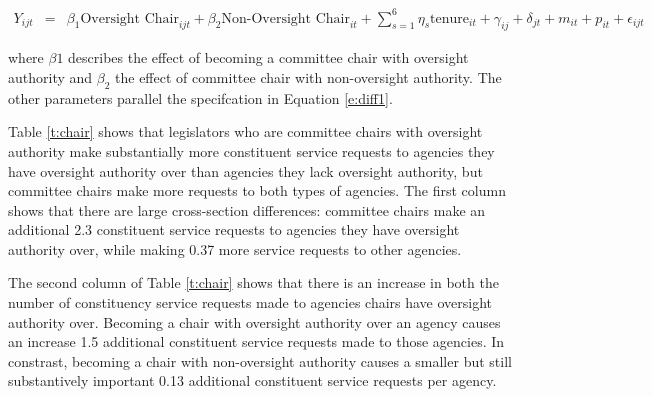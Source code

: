 \documentclass{article}
\begin{document}
\begin{eqnarray}
Y_{ijt} & = & \beta_{1} \text{Oversight Chair}_{ijt} + \beta_{2} \text{Non-Oversight Chair}_{it}  + \sum_{s = 1}^{6} \eta_{s} \text{tenure}_{it} + \gamma_{ij} +  \delta_{jt} +  m_{it} + p_{it} +  \epsilon_{ijt} \label{e:diff2}
\end{eqnarray}

where $\beta{1}$ describes the effect of becoming a committee chair with oversight authority and $\beta_{2}$ the effect of committee chair with non-oversight authority.  The other parameters parallel the specifcation in Equation \ref{e:diff1}.


Table \ref{t:chair} shows that legislators who are committee chairs with oversight authority make substantially more constituent service requests to agencies they have oversight authority over than agencies they lack oversight authority, but committee chairs make more requests to both types of agencies.  The first column shows that there are large cross-section differences: committee chairs make an additional 2.3 constituent service requests to agencies they have oversight authority over, while making 0.37 more service requests to other agencies.  


\begin{table}[hbt!]
\caption{Decomposing Chair Effect} \label{t:chair}
\begin{minipage}{\textwidth}

\end{minipage}
\end{table}

The second column of Table \ref{t:chair} shows that there is an increase in both the number of constituency service requests made to agencies chairs have oversight authority over.  Becoming a chair with oversight authority over an agency causes an increase 1.5 additional constituent service requests made to those agencies.  In constrast, becoming a chair with non-oversight authority causes a smaller but still substantively important 0.13 additional constituent service requests per agency.  
\end{document}
